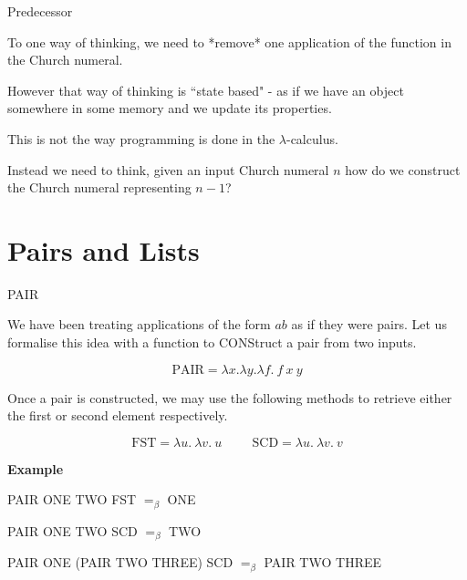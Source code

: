 \documentclass{beamer}
\begin{document}
\begin{frame}{Predecessor}

    
    To one way of thinking, we need to *remove* one application of the function in the Church numeral. 
    
    \vspace{1.5cm}
    
    However that way of thinking is ``state based" - as if we have an object somewhere in some memory and we update its properties. 
    
    \vspace{0.5cm}
    
    This is not the way programming is done in the $\lambda$-calculus. 
    
    \vspace{0.5cm}
    
    Instead we need to think, given an input Church numeral $n$ how do we construct the Church numeral representing $n-1$?
    
    \vspace{2cm}
    
\end{frame}

\section{Pairs and Lists}

\begin{frame}{PAIR}

    We have been treating applications of the form $ab$ as if they were pairs. Let us formalise this idea with a function to CONStruct a pair from two inputs.
    
    $$ \text{PAIR} = \lambda x. \lambda y. \lambda f. \ f \ x \ y$$
    
    Once a pair is constructed, we may use the following methods to retrieve either the first or second element respectively. 
    
    $$\text{FST} = \lambda u. \ \lambda v. \ u \hspace{1cm} \text{SCD} = \lambda u. \ \lambda v. \ v $$
    
    {\bf Example}
    
    PAIR ONE TWO FST  $=_{\beta}$ ONE
    
    PAIR ONE TWO SCD  $=_{\beta}$ TWO
    
    PAIR ONE (PAIR TWO THREE) SCD $=_{\beta}$ PAIR TWO THREE
    
\end{frame}
\end{document}
